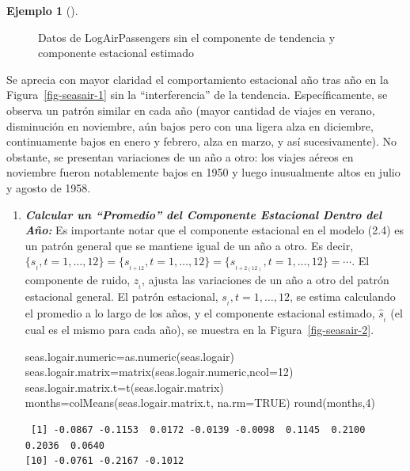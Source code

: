 \documentclass[
  us-letterpaper,
]{scrreprt}
\newenvironment{Shaded}{\begin{snugshade}}{\end{snugshade}}
\newcommand{\AttributeTok}[1]{\textcolor[rgb]{0.40,0.45,0.13}{#1}}
\newcommand{\ConstantTok}[1]{\textcolor[rgb]{0.56,0.35,0.01}{#1}}
\newcommand{\DecValTok}[1]{\textcolor[rgb]{0.68,0.00,0.00}{#1}}
\newcommand{\FunctionTok}[1]{\textcolor[rgb]{0.28,0.35,0.67}{#1}}
\newcommand{\NormalTok}[1]{\textcolor[rgb]{0.00,0.23,0.31}{#1}}
\newcommand{\OtherTok}[1]{\textcolor[rgb]{0.00,0.23,0.31}{#1}}
\theoremstyle{plain}
\theoremstyle{definition}
\newtheorem{example}{Ejemplo}[chapter]
\theoremstyle{plain}
\theoremstyle{definition}
\theoremstyle{remark}
\begin{document}
\begin{example}[]
\begin{tcolorbox}
\begin{figure}[H]
\caption{\label{fig-seasair}Datos de LogAirPassengers sin el componente
de tendencia y componente estacional estimado}

\end{figure}%

Se aprecia con mayor claridad el comportamiento estacional año tras año
en la Figura~\ref{fig-seasair-1} sin la ``interferencia'' de la
tendencia. Específicamente, se observa un patrón similar en cada año
(mayor cantidad de viajes en verano, disminución en noviembre, aún bajos
pero con una ligera alza en diciembre, continuamente bajos en enero y
febrero, alza en marzo, y así sucesivamente). No obstante, se presentan
variaciones de un año a otro: los viajes aéreos en noviembre fueron
notablemente bajos en 1950 y luego inusualmente altos en julio y agosto
de 1958.

\begin{enumerate}
\def\labelenumi{\alph{enumi}.}
\setcounter{enumi}{2}
\item
  \textbf{\emph{Calcular un ``Promedio'' del Componente Estacional
  Dentro del Año:}} Es importante notar que el componente estacional en
  el modelo (2.4) es un patrón general que se mantiene igual de un año a
  otro. Es
  decir,\(\{s_{_t}, t=1,\ldots,12\} = \{s_{_{t+12}},t=1,\ldots,12\} =\{s_{_{t+2(12)}}, t=1,\ldots,12\}=\cdots.\)
  El componente de ruido, \(z_{_t}\), ajusta las variaciones de un año a
  otro del patrón estacional general. El patrón estacional,
  \(s_{_t}, t=1,\ldots,12\), se estima calculando el promedio a lo largo
  de los años, y el componente estacional estimado, \(\hat{s}_{_t}\) (el
  cual es el mismo para cada año), se muestra en la
  Figura~\ref{fig-seasair-2}.

\begin{Shaded}
\begin{Highlighting}[]
\NormalTok{seas.logair.numeric}\OtherTok{=}\FunctionTok{as.numeric}\NormalTok{(seas.logair)}
\NormalTok{seas.logair.matrix}\OtherTok{=}\FunctionTok{matrix}\NormalTok{(seas.logair.numeric,}\AttributeTok{ncol=}\DecValTok{12}\NormalTok{)}
\NormalTok{seas.logair.matrix.t}\OtherTok{=}\FunctionTok{t}\NormalTok{(seas.logair.matrix)}
\NormalTok{months}\OtherTok{=}\FunctionTok{colMeans}\NormalTok{(seas.logair.matrix.t, }\AttributeTok{na.rm=}\ConstantTok{TRUE}\NormalTok{)}
\FunctionTok{round}\NormalTok{(months,}\DecValTok{4}\NormalTok{)}
\end{Highlighting}
\end{Shaded}

\begin{verbatim}
 [1] -0.0867 -0.1153  0.0172 -0.0139 -0.0098  0.1145  0.2100  0.2036  0.0640
[10] -0.0761 -0.2167 -0.1012
\end{verbatim}


\end{enumerate}
\end{tcolorbox}
\end{example}
\end{document}
